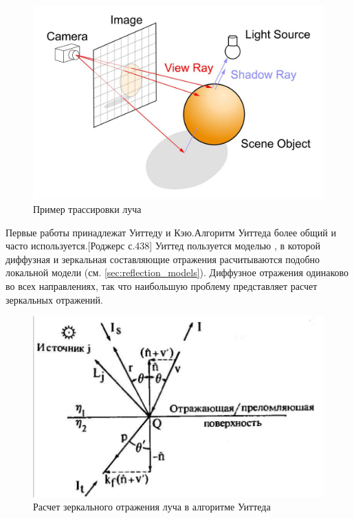 \documentclass[a4paper,14pt, unknownkeysallowed]{extreport}
\begin{document}
\begin{figure}[h]
	\centering
	\includegraphics[scale=0.4]{ray_tracing.jpg}
	\caption{Пример трассировки луча}
	\label{fig:alg_ray_tracing}
\end{figure} 

Первые работы принадлежат Уиттеду и Кэю.Алгоритм Уиттеда более общий и часто используется.[Роджерс с.438]
Уиттед пользуется моделью , в которой диффузная и зеркальная составляющие отражения расчитываются подобно локальной модели (см. \ref{sec:reflection_models}).
Диффузное отражения одинаково во всех направлениях, так что наибольшую проблему представляет расчет зеркальных отражений.\cite{Rodgers}

\begin{figure}[h]
	\centering
	\includegraphics{global_reflections}
	\caption{Расчет зеркального отражения луча в алгоритме Уиттеда}
	\label{fig:global_reflections}
\end{figure} 
\end{document}
